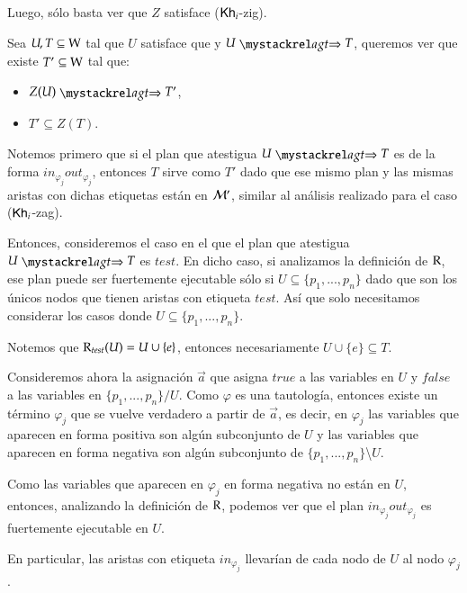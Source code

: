 \begin{demostracion}
\begin{itemize}
    Luego, sólo basta ver que $Z$ satisface ($\mathsf{Kh}_i$-zig).

    Sea $U, T \subseteq \mathrm{W}$ tal que $U$ satisface que  y $U \ultsExecAgagt T$, queremos ver que existe 
    $T' \subseteq \mathrm{W}$ tal que:

    \begin{multicols}{2}
        \begin{itemize}
            \item $Z(U) \ultsExecAgagt T'$, 
            \item $T' \subseteq Z(T)$.
        \end{itemize}
    \end{multicols}

    Notemos primero que si el plan que atestigua $U \ultsExecAgagt T$ es de la forma $in_{\varphi_j}out_{\varphi_j}$, 
    entonces $T$ sirve como $T'$ dado que ese mismo plan y las mismas aristas con dichas etiquetas están en $\mathcal{M}'$, 
    similar al análisis realizado para el caso ($\mathsf{Kh}_i$-zag).

    Entonces, consideremos el caso en el que el plan que atestigua $U \ultsExecAgagt T$ es $test$. En dicho caso, 
    si analizamos la definición de $\mathrm{R}$, ese plan puede ser fuertemente ejecutable sólo si $U \subseteq \{p_1,...,p_n\}$ 
    dado que son los únicos nodos que tienen aristas con etiqueta $test$. Así que solo necesitamos considerar los casos 
    donde $U \subseteq \{p_1,...,p_n\}$.

    Notemos que $\mathrm{R}_{test}(U) = U \cup \{e\}$, entonces necesariamente $U \cup \{e\} \subseteq T$.

    Consideremos ahora la asignación $\overrightarrow{a}$ que asigna $true$ a las variables en $U$ y $false$ a las variables 
    en $\{p_1,...,p_n\} / U$. Como $\varphi$ es una tautología, entonces existe un término $\varphi_j$ que se vuelve verdadero a partir 
    de $\overrightarrow{a}$, es decir, en $\varphi_j$ las variables que aparecen en forma positiva son algún subconjunto de 
    $U$ y las variables que aparecen en forma negativa son algún subconjunto de $\{p_1,...,p_n\}$\textbackslash$U$.

    Como las variables que aparecen en $\varphi_j$ en forma negativa no están en $U$, entonces, analizando la definición de $\mathrm{R}$, 
    podemos ver que el plan $in_{\varphi_j}out_{\varphi_j}$ es fuertemente ejecutable en $U$. 
    
    En particular, las aristas con etiqueta $in_{\varphi_j}$ llevarían de cada nodo de $U$ al nodo $\varphi_j$.


\end{itemize}
\end{demostracion}
